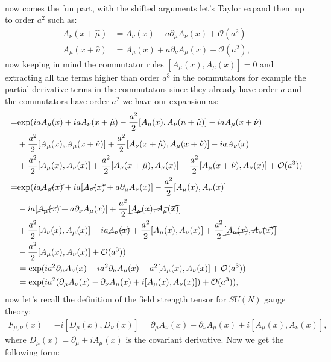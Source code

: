 \documentclass[english,twoside,openright]{UH_TCM_MSc}
\begin{document}
\begin{appendices}
\begin{align}
\end{align}
now comes the fun part, with the shifted arguments let's Taylor expand them up to order $a^2$ such as:
\begin{align}
    A_\nu(x+\hat\mu) &= A_\nu(x) + a\partial_\mu A_\nu(x) + \mathcal{O}(a^2) \\
    A_\mu(x+\hat\nu) &= A_\mu(x) + a\partial_\nu A_\mu(x) + \mathcal{O}(a^2),
\end{align}
now keeping in mind the commutator rules $[A_\mu(x),A_\mu(x)] = 0$ and extracting all the terms higher than order $a^3$ in the commutators for example the partial derivative terms in the commutators since they already have order $a$ and the commutators have order $a^2$ we have our expansion as:
\begin{align}
    =&\text{exp} (ia A_\mu(x) + iaA_\nu(x+\hat\mu)-\frac{a^2}{2}[A_\mu(x),A_\nu(n+\hat\mu)]-iaA_\mu(x+\hat\nu)\\
    &+\frac{a^2}{2}[A_\mu(x),A_\mu(x+\hat\nu)]+\frac{a^2}{2}[A_\nu(x+\hat\mu),A_\mu(x+\hat\nu)]-iaA_\nu(x)\\
    &+\frac{a^2}{2}[A_\mu(x),A_\nu(x)]+\frac{a^2}{2}[A_\nu(x+\hat\mu),A_\nu(x)]-\frac{a^2}{2}[A_\mu(x+\hat\nu),A_\nu(x)]+\mathcal{O}(a^3)) \\
    =&\text{exp} (ia \cancel{A_\mu(x)} + ia[\cancel{A_\nu(x)} + a\partial_\mu A_\nu(x)]-\frac{a^2}{2}[A_\mu(x),A_\nu(x)]\\
    &-ia[\cancel{A_\mu(x)} + a\partial_\nu A_\mu(x)]+\frac{a^2}{2}\cancel{[A_\mu(x),A_\mu(x)]}\\
    &+\frac{a^2}{2}[A_\nu(x),A_\mu(x)]-ia\cancel{A_\nu(x)}+\frac{a^2}{2}[A_\mu(x),A_\nu(x)]+\frac{a^2}{2}\cancel{[A_\nu(x),A_\nu(x)]}\\
    &-\frac{a^2}{2}[A_\mu(x) ,A_\nu(x)]+\mathcal{O}(a^3)) \\
    &=\exp(ia^2\partial_\mu A_\nu(x)-ia^2\partial_\nu A_\mu(x)-a^2[A_\mu(x),A_\nu(x)]+\mathcal{O}(a^3))\\
    &=\exp(ia^2(\partial_\mu A_\nu(x)-\partial_\nu A_\mu(x)+i[A_\mu(x),A_\nu(x)])+\mathcal{O}(a^3)),
\end{align}
now let's recall the definition of the field strength tensor for $SU(N)$ gauge theory:
\begin{align}
    F_{\mu,\nu}(x) = -i[D_\mu(x),D_\nu(x)] = \partial_\mu A_\nu(x)-\partial_\nu A_\mu(x)+i[A_\mu(x),A_\nu(x)],
\end{align}
where $D_\mu(x) = \partial_\mu + iA_\mu(x)$ is the covariant derivative. Now we get the following form:
\begin{align}

\end{align}
\end{appendices}
\end{document}
